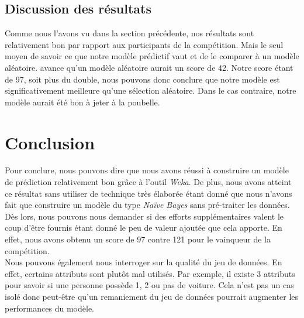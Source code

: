 \documentclass[10pt,a4paper]{article}
\begin{document}
			\subsection{Discussion des résultats}
			
				Comme nous l'avons vu dans la section précédente, nos résultats sont relativement bon par rapport aux participants de la compétition. Mais le seul moyen de savoir ce que notre modèle prédictif vaut et de le comparer à un modèle aléatoire. \cite[Putten]{CoIlChallenge} avance qu'un modèle aléatoire aurait un score de 42. Notre score étant de 97, soit plus du double, nous pouvons donc conclure que notre modèle est significativement meilleure qu'une sélection aléatoire. Dans le cas contraire, notre modèle aurait été bon à jeter à la poubelle.\\
				
			\section{Conclusion}
			
				Pour conclure, nous pouvons dire que nous avons réussi à construire un modèle de prédiction relativement bon grâce à l'outil \textit{Weka}. De plus, nous avons atteint ce résultat sans utiliser de technique très élaborée étant donné que nous n'avons fait que construire un modèle du type \textit{Naïve Bayes} sans pré-traiter les données. Dès lors, nous pouvons nous demander si des efforts supplémentaires valent le coup d'être fournis étant donné le peu de valeur ajoutée que cela apporte. En effet, nous avons obtenu un score de 97 contre 121 pour le vainqueur de la compétition.\\
				
				Nous pouvons également nous interroger sur la qualité du jeu de données. En effet, certains attributs sont plutôt mal utilisés. Par exemple, il existe 3 attributs pour savoir si une personne possède 1, 2 ou pas de voiture. Cela n'est pas un cas isolé donc peut-être qu'un remaniement du jeu de données pourrait augmenter les performances du modèle.   
				
			
	
	
          	
\end{document}
